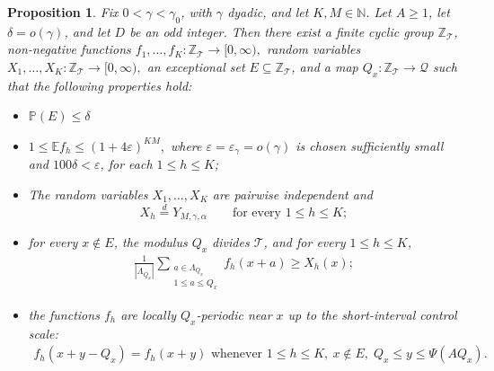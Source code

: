 \documentclass[12pt,leqno]{amsart}
\newcounter{counter}
\newcounter{counter2}
\numberwithin{equation}{section}
\numberwithin{counter2}{section}
\newtheorem{proposition}[subsection]{Proposition}
\newcounter{theorem}
\theoremstyle{definition}
\theoremstyle{plain}
\begin{document}
\begin{proposition}
	\label{p:lavictoire-short-control}
	Fix \(0<\gamma<\gamma_0\), with \(\gamma\) dyadic, and let \(K,M\in\mathbb N\).
	Let \(A\geq1\), let $\delta=o(\gamma)$, and let \(D\) be an odd integer. Then there
	exist a finite cyclic group \(\mathbb Z_{\mathcal T}\), non-negative functions $	f_1,\dots,f_K:\mathbb Z_{\mathcal T}\to[0,\infty),$ random variables $	X_1,\dots,X_K:\mathbb Z_{\mathcal T}\to[0,\infty),$ an exceptional set \(E\subseteq\mathbb Z_{\mathcal T}\), and a map $	Q_x:\mathbb Z_{\mathcal T}\to\mathcal Q$ such that the following properties hold:  \begin{itemize}
		\item $	\mathbb P(E)\leq \delta $
		\item  $	1\leq \mathbb E f_h\leq (1+4\varepsilon)^{KM},$ where \(\varepsilon=\varepsilon_\gamma=o(\gamma)\) is chosen sufficiently small and $100\delta < \varepsilon$, for each \(1\leq h\leq K\);
		\item The random variables \(X_1,\dots,X_K\) are pairwise independent and
		\[
		X_h\stackrel{d}{=}Y_{M,\gamma,\alpha}
		\qquad
		\text{for every }1\leq h\leq K;
		\]
		\item for every \(x\notin E\), the modulus \(Q_x\) divides \(\mathcal T\), and
		for every \(1\leq h\leq K\),
		\begin{align}\label{e:rdomest}
		    \frac1{|\Lambda_{Q_x}|}  \sum_{\substack{ a\in\Lambda_{Q_x}\\1\leq a\leq Q_x}}
		f_h(x+a)
		\geq
		X_h(x);
		\end{align}
		\item  the functions \(f_h\) are locally \(Q_x\)-periodic near \(x\) up to the
		short-interval control scale: 	
        \begin{align}\label{e:LPIdentity}
            f_h(x+y-Q_x)=f_h(x+y) \text{ whenever } 	1\leq h\leq K,
		\
		x\notin E,
		\; 
		Q_x\leq y\leq \Psi(AQ_x).
        \end{align}
        
		
	\end{itemize}

\end{proposition}
\end{document}
